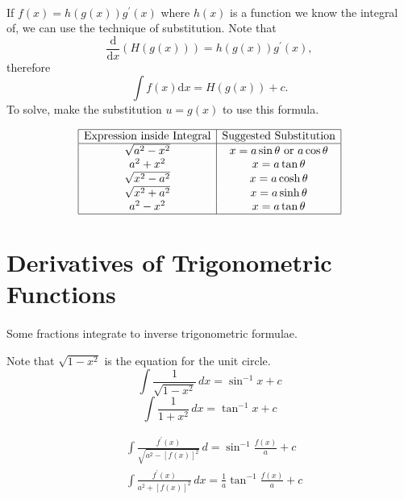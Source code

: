 \documentclass[../multivariate_calculus.tex]{subfiles}
\begin{document}
        \paragraph{}
        If $f(x)=h(g(x))g^\prime(x)$ where $h(x)$ is a function we know the integral of, we can use the technique of substitution.
        Note that
        \begin{equation}
            \frac{\mathrm{d}}{\mathrm{d}x}(H(g(x)))=h(g(x))g^\prime(x),
        \end{equation}
        therefore
        \begin{equation}
            \int f(x)\mathrm{d}x=H(g(x))+c.
        \end{equation}
        To solve, make the substitution $u=g(x)$ to use this formula.
        \begin{center}
            \[\begin{array}{|c|c|}
                \hline
                \text{Expression inside Integral} & \text{Suggested Substitution} \\
                \hline
                \sqrt{a^2-x^2} & x=a\sin\theta\ \text{or}\ a\cos\theta\\ 
                a^2 + x^2 & x=a\tan\theta \\
                \sqrt{x^2-a^2} & x=a\cosh\theta \\
                \sqrt{x^2+a^2} & x=a\sinh\theta \\
                a^2-x^2 & x=a\tan\theta \\
                \hline
            \end{array}\]
        \end{center}

    \section{Derivatives of Trigonometric Functions}
        \paragraph{}
        Some fractions integrate to inverse trigonometric formulae.
        \begin{example}
            Note that $\sqrt{1-x^2}$ is the equation for the unit circle.
            \begin{equation*}
                \int\frac{1}{\sqrt{1-x^2}}\,dx = \sin^{-1}x+c
            \end{equation*}
            \begin{equation*}
                \int\frac{1}{1+x^2}\,dx = \tan^{-1}x+c
            \end{equation*}
        \end{example}
        \begin{align*}
            &\int\frac{f^\prime(x)}{\sqrt{a^2-\left[f(x)\right]^2}}\,d = \sin^{-1}\frac{f(x)}{a}+c \\
            &\int\frac{f^\prime(x)}{a^2+\left[f(x)\right]^2}\,dx = \frac{1}{a}\tan^{-1}\frac{f(x)}{a}+c
        \end{align*}
        
\end{document}
